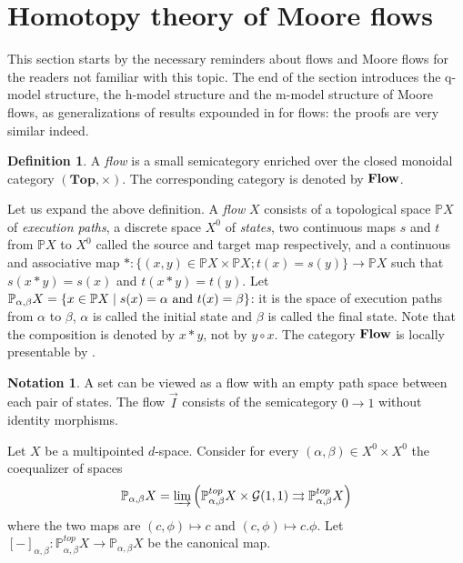 \documentclass[a4paper,12pt]{amsart}
\newcommand{\p}{\times}
\renewcommand{\vec}{\overrightarrow}
\renewcommand{\P}{\mathbb{P}}
\theoremstyle{definition}
\newtheorem{defn}[thm]{Definition}
\newcommand{\bd}{\begin{defn}}
\newcommand{\ed}{\end{defn}}
\newtheorem{nota}[thm]{Notation}
\renewcommand{\top}{{\mathbf{Top}}}
\newcommand{\vI}{\vec{I}}
\newcommand{\brm}[1]{{\rm{\mathbf{#1}}}}
\newcommand{\dtop}{{\brm{Flow}}}
\newcommand{\liminj}{\varinjlim}
\renewcommand{\P}{\mathbb{P}}
\begin{document}
\section{Homotopy theory of Moore flows}
\label{qhm_sec}

This section starts by the necessary reminders about flows and Moore flows for the readers not familiar with this topic. The end of the section introduces the q-model structure, the h-model structure and the m-model structure of Moore flows, as generalizations of results expounded in \cite{QHMmodel} for flows: the proofs are very similar indeed.

\bd \cite[Definition~4.11]{model3} \label{def-flow}
A \textit{flow} is a small semicategory enriched over the closed monoidal category $(\top,\p)$. The corresponding category is denoted by $\dtop$. 
\ed

Let us expand the above definition. A \textit{flow} $X$ consists of a topological space $\P X$ of \textit{execution paths}, a discrete space $X^0$ of \textit{states}, two continuous maps $s$ and $t$ from $\P X$ to $X^0$ called the source and target map respectively, and a continuous and associative map $*:\{(x,y)\in \P X\p \P X; t(x)=s(y)\}\longrightarrow \P X$ such that $s(x*y)=s(x)$ and $t(x*y)=t(y)$. Let $\P_{\alpha,\beta}X = \{x\in \P X\mid s(x)=\alpha \hbox{ and } t(x)=\beta\}$: it is the space of execution paths from $\alpha$ to $\beta$, $\alpha$ is called the initial state and $\beta$ is called the final state. Note that the composition is denoted by $x*y$, not by $y\circ x$. The category $\dtop$ is locally presentable by \cite[Theorem~6.11]{Moore1}. 

\begin{nota} \label{basic-example-flow}
	A set can be viewed as a flow with an empty path space between each pair of states. The flow $\vI$ consists of the semicategory $0\rightarrow 1$ without identity morphisms.
\end{nota}

Let $X$ be a multipointed $d$-space. Consider for every $(\alpha,\beta)\in X^0 \p X^0$ the coequalizer of spaces \[\P_{\alpha,\beta}X = \liminj\left( \P^{top}_{\alpha,\beta}X\p \mathcal{G}(1,1) \rightrightarrows \P^{top}_{\alpha,\beta}X\right)\] where the two maps are $(c,\phi)\mapsto c$ and $(c,\phi)\mapsto c.\phi$. Let $[-]_{\alpha,\beta}:\P^{top}_{\alpha,\beta}X \rightarrow \P_{\alpha,\beta}X$ be the canonical map. 
\end{document}
